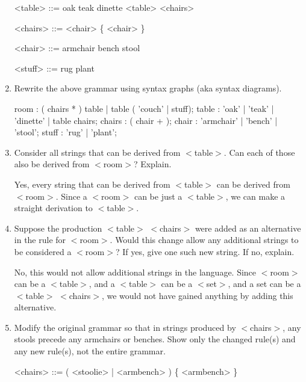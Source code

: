 \documentclass[12pt,letterpaper]{article}
\begin{document}
\begin{enumerate}
\begin{grammar}
        <table> ::= oak
                \alt teak
                \alt dinette
                \alt <table> <chairs>

        <chairs> ::= <chair> \{ <chair> \}

        <chair> ::= armchair
                \alt bench
                \alt stool

        <stuff> ::= rug
                \alt plant
      \end{grammar}

    \item Rewrite the above grammar using syntax graphs (aka syntax diagrams).
      \begin{rail}
        room : ( chairs * ) table | table ( 'couch' | stuff);
        table : 'oak' | 'teak' | 'dinette' | table chairs;
        chairs : ( chair + );
        chair : 'armchair' | 'bench' | 'stool';
        stuff : 'rug' | 'plant';
      \end{rail}

    \item
      Consider all strings that can be derived from $<$table$>$.
      Can each of those also be derived from $<$room$>$?
      Explain.

      Yes, every string that can be derived from $<$table$>$
      can be derived from $<$room$>$.
      Since a $<$room$>$ can be just a $<$table$>$,
      we can make a straight derivation to $<$table$>$.

    \item
      Suppose the production $<$table$>$ $<$chairs$>$ were added as an alternative in the rule for $<$room$>$.
      Would this change allow any additional strings to be considered a $<$room$>$?
      If yes, give one such new string.
      If no, explain.

      No, this would not allow additional strings in the language.
      Since $<$room$>$ can be a $<$table$>$, and a $<$table$>$ can be a $<$set$>$, and a set can be a $<$table$>$ $<$chairs$>$,
      we would not have gained anything by adding this alternative.

    \item
      Modify the original grammar so that in strings produced by $<$chairs$>$,
      any stools precede any armchairs or benches.
      Show only the changed rule(s) and any new rule(s),
      not the entire grammar.

      \begin{grammar}
        <chairs> ::=  ( <stoolie> | <armbench> ) \{ <armbench> \}


\end{grammar}
\end{enumerate}
\end{document}

